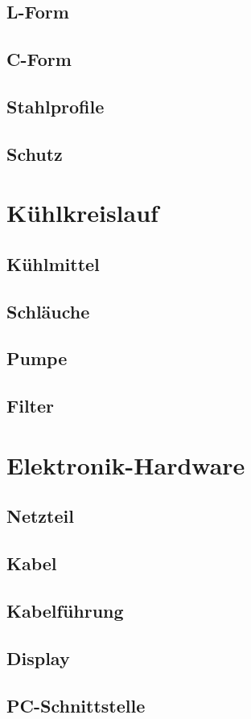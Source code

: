 \documentclass[
	a4paper,
	smallheadings,
	german,
	]
	{scrreprt}
\begin{document}
	\subsection{L-Form}
	\subsection{C-Form}
\subsection{Stahlprofile}
\subsection{Schutz}
\section{Kühlkreislauf}
	\subsection{Kühlmittel}
	\subsection{Schläuche}
	\subsection{Pumpe}
	\subsection{Filter}
\section{Elektronik-Hardware}
	\subsection{Netzteil}
	\subsection{Kabel}
	\subsection{Kabelführung}
	\subsection{Display}
	\subsection{PC-Schnittstelle}
\end{document}
